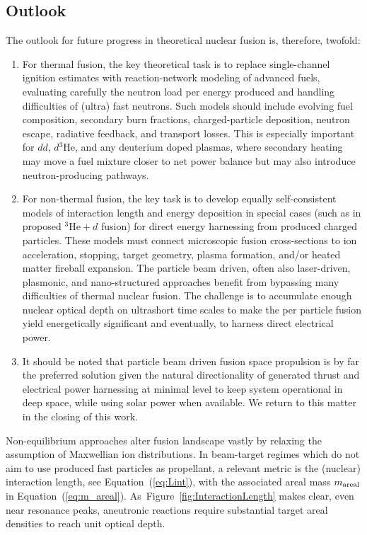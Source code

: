 \documentclass[particles,article,accept,pdftex,moreauthors]{Definitions/mdpi}
\newcommand{\req}[1]{Equation~(\ref{#1})}
\newcommand{\rf}[1]{Figure~\ref{#1}}
\begin{document}
\subsection{Outlook}
The outlook for future progress in theoretical nuclear fusion is, therefore, twofold:
\begin{enumerate}
\item 
For thermal fusion, the key theoretical task is to replace single-channel ignition estimates with reaction-network modeling of advanced fuels, evaluating carefully the neutron load per energy produced and handling difficulties of (ultra) fast neutrons. Such models should include evolving fuel composition, secondary burn fractions, charged-particle deposition, neutron escape, radiative feedback, and transport losses. This is especially important for $dd$, $d{}^3\mathrm{He}$, and any deuterium doped plasmas, where secondary heating may move a fuel mixture closer to net power balance but may also introduce neutron-producing pathways.
\item 
For non-thermal fusion, the key task is to develop equally self-consistent models of interaction length and energy deposition in special cases (such as in proposed ${}^3\mathrm{He}+d$ fusion) for direct energy harnessing from produced charged particles. These models must connect microscopic fusion cross-sections to ion acceleration, stopping, target geometry, plasma formation, and/or heated matter fireball expansion. The particle beam driven, often also laser-driven, plasmonic, and nano-structured approaches benefit from bypassing many difficulties of thermal nuclear fusion. The challenge is to accumulate enough nuclear optical depth on ultrashort time scales to make the per particle fusion yield energetically significant and eventually, to harness direct electrical power.
\item
It should be noted that particle beam driven fusion space propulsion is by far the preferred solution given the natural directionality of generated thrust and electrical power harnessing at minimal level to keep system operational in deep space, while using solar power when available. We return to this matter in the closing of this work.
\end{enumerate}

Non-equilibrium approaches alter fusion landscape vastly by relaxing the assumption of Maxwellian ion distributions. In beam-target regimes which do not aim to use produced fast particles as propellant, a relevant metric is the (nuclear) interaction length, see \req{eq:Lint}, with the associated areal mass $m_{\rm areal}$ in \req{eq:m_areal}. As~\rf{fig:InteractionLength} makes clear, even near resonance peaks, aneutronic reactions require substantial target areal densities to reach unit optical depth.
\end{document}
